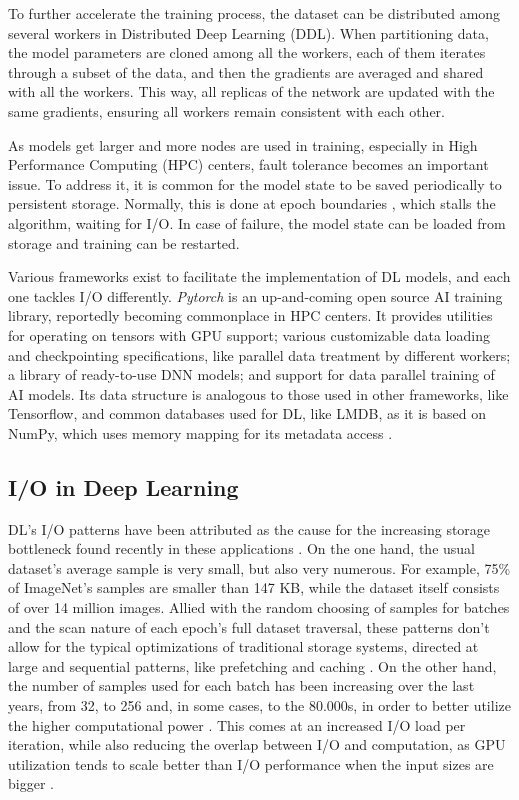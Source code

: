 \documentclass[conference]{IEEEtran}
\begin{document}
To further accelerate the training process, the dataset can be distributed among several workers in Distributed Deep Learning (DDL). When partitioning data, the model parameters are cloned among all the workers, each of them iterates through a subset of the data, and then the gradients are averaged and shared with all the workers. This way, all replicas of the network are updated with the same gradients, ensuring all workers remain consistent with each other.

As models get larger and more nodes are used in training, especially in High Performance Computing (HPC) centers, fault tolerance becomes an important issue. To address it, it is common for the model state to be saved periodically to persistent storage. Normally, this is done at epoch boundaries \cite{checkfreq}, which stalls the algorithm, waiting for I/O. In case of failure, the model state can be loaded from storage and training can be restarted.

Various frameworks exist to facilitate the implementation of DL models, and each one tackles I/O differently. \textit{Pytorch} \cite{pytorch} is an up-and-coming open source AI training library, reportedly becoming commonplace in HPC centers. It provides utilities for operating on tensors with GPU support; various customizable data loading and checkpointing specifications, like parallel data treatment by different workers; a library of ready-to-use DNN models; and support for data parallel training of AI models. Its data structure is analogous to those used in other frameworks, like Tensorflow, and common databases used for DL, like LMDB, as it is based on NumPy, which uses memory mapping for its metadata access \cite{LMDB}.

\subsection{I/O in Deep Learning}

DL's I/O patterns have been attributed as the cause for the increasing storage bottleneck found recently in these applications \cite{beegfs}. On the one hand, the usual dataset's average sample is very small, but also very numerous. For example, 75\% of ImageNet's samples are smaller than 147 KB, while the dataset itself consists of over 14 million images. Allied with the random choosing of samples for batches and the scan nature of each epoch's full dataset traversal, these patterns don't allow for the typical optimizations of traditional storage systems, directed at large and sequential patterns, like prefetching and caching \cite{initial}. On the other hand, the number of samples used for each batch has been increasing over the last years, from 32, to 256 and, in some cases, to the 80.000s, in order to better utilize the higher computational power \cite{nvme}. This comes at an increased I/O load per iteration, while also reducing the overlap between I/O and computation, as GPU utilization tends to scale better than I/O performance when the input sizes are bigger \cite{TFbenchmark}.
\end{document}
